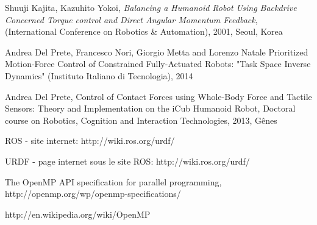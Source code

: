 \begin{thebibliography}{9}
  Shuuji Kajita, Kazuhito Yokoi,
  \emph{Balancing a Humanoid Robot Using Backdrive Concerned Torque control and Direct Angular Momentum Feedback},
  (International Conference on Robotics \& Automation),
  2001, Seoul, Korea
  
  Andrea Del Prete, Francesco Nori, Giorgio Metta and Lorenzo Natale
  Prioritized Motion-Force Control of Constrained Fully-Actuated Robots: "Task Space Inverse Dynamics"
  (Instituto Italiano di Tecnologia),
  2014

  Andrea Del Prete,
  Control of Contact Forces using Whole-Body Force and Tactile Sensors: Theory and Implementation on the iCub Humanoid Robot,
  Doctoral course on Robotics, Cognition and Interaction Technologies,
  2013, Gênes

  ROS - site internet:
  http://wiki.ros.org/urdf/

  URDF - page internet sous le site ROS:
  http://wiki.ros.org/urdf/




  The OpenMP API specification for parallel programming,
  http://openmp.org/wp/openmp-specifications/

  http://en.wikipedia.org/wiki/OpenMP
  

%  

  

  
\end{thebibliography}
